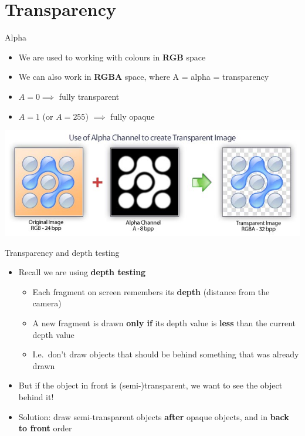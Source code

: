 \part{Transparency}
\frame{\partpage}

\begin{frame}{Alpha}
	\begin{itemize}
		\item We are used to working with colours in \textbf{RGB} space
		\pause\item We can also work in \textbf{RGBA} space, where A = alpha = transparency
		\pause\item $A=0 \implies$ fully transparent
		\pause\item $A=1$ (or $A=255$) $\implies$ fully opaque
	\end{itemize}
	\pause
	\begin{center}
		\includegraphics[width=\textwidth]{alpha_channel}
	\end{center}
\end{frame}

\begin{frame}{Transparency and depth testing}
	\begin{itemize}
		\item Recall we are using \textbf{depth testing}
			\begin{itemize}
				\pause\item Each fragment on screen remembers its \textbf{depth} (distance from the camera)
				\pause\item A new fragment is drawn \textbf{only if} its depth value is \textbf{less} than the current depth value
				\pause\item I.e.\ don't draw objects that should be behind something that was already drawn
			\end{itemize}
		\pause\item But if the object in front is (semi-)transparent, we want to see the object behind it!
		\pause\item Solution: draw semi-transparent objects \textbf{after} opaque objects,
			and in \textbf{back to front} order
	\end{itemize}
\end{frame}
